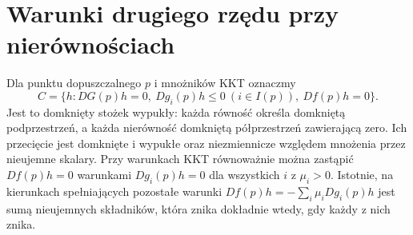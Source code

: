 \section{Warunki drugiego rzędu przy nierównościach}

\begin{definicja}
\label{ma2:def:critical-cone}
Dla punktu dopuszczalnego $p$ i mnożników KKT
oznaczmy
\[
 C=\{h: DG(p)h=0,\ Dg_i(p)h\le0\ (i\in I(p)),
                         \ Df(p)h=0\}.
\]
Jest to domknięty stożek wypukły: każda równość
określa domkniętą podprzestrzeń, a każda nierówność
domkniętą półprzestrzeń zawierającą zero. Ich przecięcie
jest domknięte i wypukłe oraz niezmiennicze względem
mnożenia przez nieujemne skalary.
Przy warunkach KKT równoważnie można zastąpić
$Df(p)h=0$ warunkami $Dg_i(p)h=0$ dla wszystkich
$i$ z $\mu_i>0$. Istotnie, na kierunkach
spełniających pozostałe warunki
$Df(p)h=-\sum_i\mu_i Dg_i(p)h$ jest sumą
nieujemnych składników, która znika dokładnie
wtedy, gdy każdy z nich znika.
\end{definicja}

